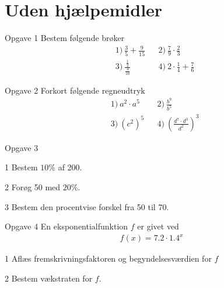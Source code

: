 \section*{Uden hjælpemidler}
\begin{opgavetekst}{Opgave 1}
	Bestem følgende brøker
	\begin{align*}
		&1) \   \frac{3}{5} + \frac{9}{15}   &&2) \  \frac{7}{9}\cdot\frac{2}{3}     \\
		&3) \  \frac{\frac{1}{2}}{\frac{4}{10}}    &&4) \  2\cdot \frac{1}{4} + \frac{7}{6}    
	\end{align*}
\end{opgavetekst}

\begin{opgavetekst}{Opgave 2}
	Forkort følgende regneudtryk
	\begin{align*}
		&1) \   a^2\cdot a^5    &&2) \ \frac{b^9}{b^5}     \\
		&3) \   (c^2)^5    &&4) \  \left(\frac{d^7\cdot d^3}{d^2}\right)^3    
	\end{align*}
\end{opgavetekst}

\begin{opgavetekst}{Opgave 3}
\end{opgavetekst}

\begin{delopgave}{}{1}
	Bestem $10\%$ af 200.
\end{delopgave}
\begin{delopgave}{}{2}
	Forøg 50 med $20\%$.
\end{delopgave}
\begin{delopgave}{}{3}
	Bestem den procentvise forskel fra 50 til 70.
\end{delopgave}


\begin{opgavetekst}{Opgave 4}
	En eksponentialfunktion $f$ er givet ved
	\begin{align*}
		f(x) = 7.2\cdot 1.4^x
	\end{align*}
\end{opgavetekst}
\begin{delopgave}{}{1}
	Aflæs fremskrivningsfaktoren og begyndelsesværdien for $f$
\end{delopgave}
\begin{delopgave}{}{2}
	Bestem vækstraten for $f$.
\end{delopgave}


